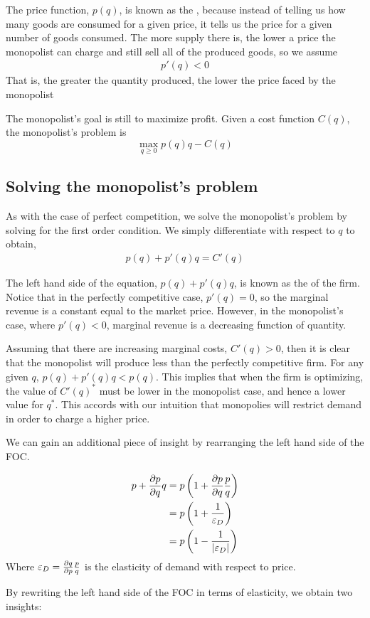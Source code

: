 The price function, $p(q)$, is known as the , because instead of telling us how many goods are consumed for a given price, it tells us the price for a given number of goods consumed. The more supply there is, the lower a price the monopolist can charge and still sell all of the produced goods, so we assume 
\begin{align*}
    p'(q) < 0
\end{align*} 
That is, the greater the quantity produced, the lower the price faced by the monopolist

The monopolist's goal is still to maximize profit. Given a cost function $C(q)$, the monopolist's problem is
\begin{equation*}
    \max_{q \geq 0} p(q) q - C(q)
\end{equation*}

\subsection*{Solving the monopolist's problem}
As with the case of perfect competition, we solve the monopolist's problem by solving for the first order condition. We simply differentiate with respect to $q$ to obtain,
\begin{align*}
    p(q) + p'(q) q = C'(q)
\end{align*}

\begin{definition*} 
    The left hand side of the equation, $p(q) + p'(q) q$, is known as the  of the firm. Notice that in the perfectly competitive case, $p'(q) = 0$, so the marginal revenue is a constant equal to the market price. However, in the monopolist's case, where $p'(q) < 0$, marginal revenue is a decreasing function of quantity. 
\end{definition*}

Assuming that there are increasing marginal costs, $C'(q) > 0$, then it is clear that the monopolist will produce less than the perfectly competitive firm. For any given $q$, $p(q) + p'(q) q < p(q)$. This implies that when the firm is optimizing, the value of $C'(q)^*$ must be lower in the monopolist case, and hence a lower value for $q^*$. This accords with our intuition that monopolies will restrict demand in order to charge a higher price. 

We can gain an additional piece of insight by rearranging the left hand side of the FOC.

\begin{align*}
    p + \frac{\partial p}{\partial q} q &= p \left(1 + \frac{\partial p}{\partial q} \frac{p}{q}\right) \\ 
    &= p \left(1 + \frac{1}{\varepsilon_D}\right) \\
    &= p \left(1 - \frac{1}{|\varepsilon_D|}\right)
\end{align*}
Where $\varepsilon_D = \frac{\partial q}{\partial p}\frac{p}{q}$ is the elasticity of demand with respect to price. 

By rewriting the left hand side of the FOC in terms of elasticity, we obtain two insights:
